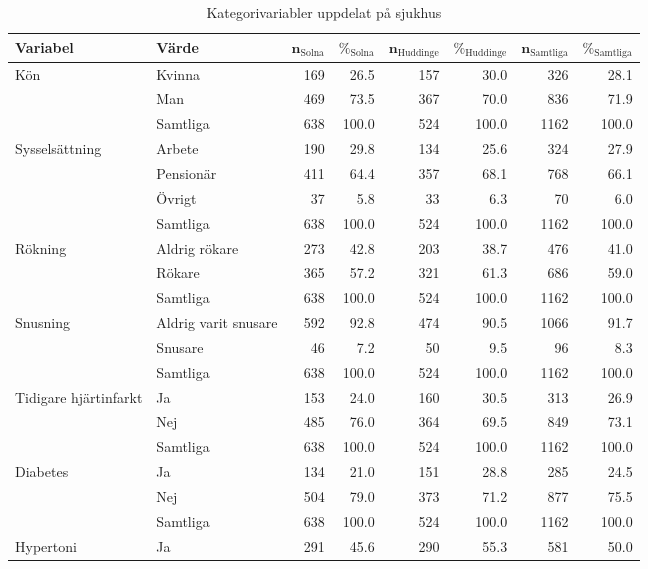 \begin{table}[htbp]
\centering
\caption{Kategorivariabler uppdelat på sjukhus} 
\label{tab:sh2}
{\footnotesize
\begin{tabular}{ll|rr|rr|rr}
 \textbf{Variabel} & \textbf{Värde} & $\mathbf{n_{\mathrm{Solna}}}$ & $\mathbf{\%_{\mathrm{Solna}}}$ & $\mathbf{n_{\mathrm{Huddinge}}}$ & $\mathbf{\%_{\mathrm{Huddinge}}}$ & $\mathbf{n_{\mathrm{Samtliga}}}$ & $\mathbf{\%_{\mathrm{Samtliga}}}$ \\ 
  \hline
Kön & Kvinna & 169 & 26.5 & 157 & 30.0 & 326 & 28.1 \\ 
   & Man & 469 & 73.5 & 367 & 70.0 & 836 & 71.9 \\ 
   \hline
 & Samtliga & 638 & 100.0 & 524 & 100.0 & 1162 & 100.0 \\ 
   \hline
\hline
Sysselsättning & Arbete & 190 & 29.8 & 134 & 25.6 & 324 & 27.9 \\ 
   & Pensionär & 411 & 64.4 & 357 & 68.1 & 768 & 66.1 \\ 
   & Övrigt & 37 & 5.8 & 33 & 6.3 & 70 & 6.0 \\ 
   \hline
 & Samtliga & 638 & 100.0 & 524 & 100.0 & 1162 & 100.0 \\ 
   \hline
\hline
Rökning & Aldrig rökare & 273 & 42.8 & 203 & 38.7 & 476 & 41.0 \\ 
   & Rökare & 365 & 57.2 & 321 & 61.3 & 686 & 59.0 \\ 
   \hline
 & Samtliga & 638 & 100.0 & 524 & 100.0 & 1162 & 100.0 \\ 
   \hline
\hline
Snusning & Aldrig varit snusare & 592 & 92.8 & 474 & 90.5 & 1066 & 91.7 \\ 
   & Snusare & 46 & 7.2 & 50 & 9.5 & 96 & 8.3 \\ 
   \hline
 & Samtliga & 638 & 100.0 & 524 & 100.0 & 1162 & 100.0 \\ 
   \hline
\hline
Tidigare hjärtinfarkt & Ja & 153 & 24.0 & 160 & 30.5 & 313 & 26.9 \\ 
   & Nej & 485 & 76.0 & 364 & 69.5 & 849 & 73.1 \\ 
   \hline
 & Samtliga & 638 & 100.0 & 524 & 100.0 & 1162 & 100.0 \\ 
   \hline
\hline
Diabetes & Ja & 134 & 21.0 & 151 & 28.8 & 285 & 24.5 \\ 
   & Nej & 504 & 79.0 & 373 & 71.2 & 877 & 75.5 \\ 
   \hline
 & Samtliga & 638 & 100.0 & 524 & 100.0 & 1162 & 100.0 \\ 
   \hline
\hline
Hypertoni & Ja & 291 & 45.6 & 290 & 55.3 & 581 & 50.0 \\ 

\end{tabular}}
\end{table}
